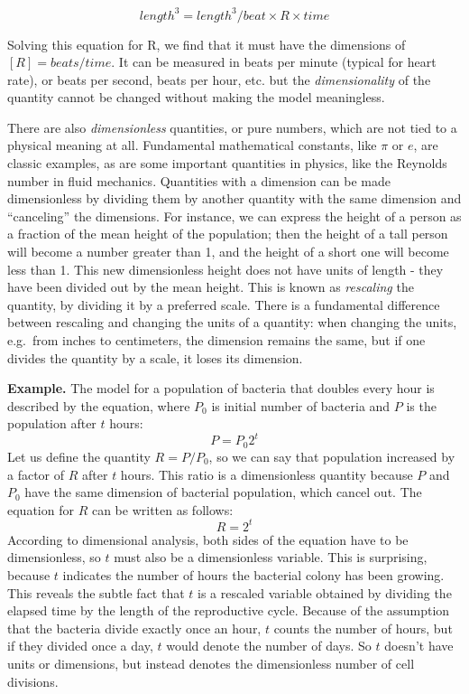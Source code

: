 \documentclass[
  letterpaper,
  DIV=11,
  numbers=noendperiod]{scrreprt}
\begin{document}
\[length^3 = length^3/ beat \times R \times time\]

Solving this equation for R, we find that it must have the dimensions of
\([R] = beats/time\). It can be measured in beats per minute (typical
for heart rate), or beats per second, beats per hour, etc. but the
\emph{dimensionality} of the quantity cannot be changed without making
the model meaningless.

There are also  \emph{dimensionless}
quantities, or pure numbers, which are not tied to a physical meaning at
all. Fundamental mathematical constants, like \(\pi\) or \(e\), are
classic examples, as are some important quantities in physics, like the
Reynolds number in fluid mechanics. \cite{strogatz_nonlinear_2001}
Quantities with a dimension can be made dimensionless by dividing them
by another quantity with the same dimension and ``canceling'' the
dimensions. For instance, we can express the height of a person as a
fraction of the mean height of the population; then the height of a tall
person will become a number greater than 1, and the height of a short
one will become less than 1. This new dimensionless height does not have
units of length - they have been divided out by the mean height. This is
known as  \emph{rescaling} the quantity, by dividing it
by a preferred scale. There is a fundamental difference between
rescaling and changing the units of a quantity: when changing the units,
e.g.~from inches to centimeters, the dimension remains the same, but if
one divides the quantity by a scale, it loses its dimension.

\textbf{Example.} The model for a population of bacteria that doubles
every hour is described by the equation, where \(P_0\) is initial number
of bacteria and \(P\) is the population after \(t\) hours:
\[ P = P_0 2^t \] Let us define the quantity \(R=P/P_0\), so we can say
that population increased by a factor of \(R\) after \(t\) hours. This
ratio is a dimensionless quantity because \(P\) and \(P_0\) have the
same dimension of bacterial population, which cancel out. The equation
for \(R\) can be written as follows: \[ R= 2^t \] According to
dimensional analysis, both sides of the equation have to be
dimensionless, so \(t\) must also be a dimensionless variable. This is
surprising, because \(t\) indicates the number of hours the bacterial
colony has been growing. This reveals the subtle fact that \(t\) is a
rescaled variable obtained by dividing the elapsed time by the length of
the reproductive cycle. Because of the assumption that the bacteria
divide exactly once an hour, \(t\) counts the number of hours, but if
they divided once a day, \(t\) would denote the number of days. So \(t\)
doesn't have units or dimensions, but instead denotes the dimensionless
number of cell divisions.
\end{document}
